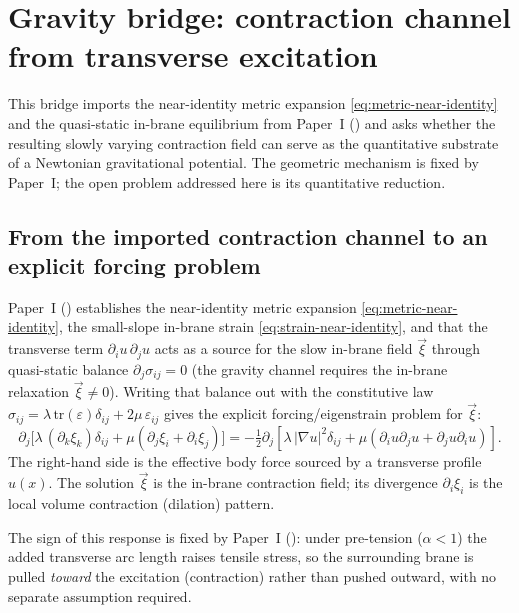 \section{Gravity bridge: contraction channel from transverse excitation}
\label{sec:gravity}

This bridge imports the near-identity metric expansion \eqref{eq:metric-near-identity} and
the quasi-static in-brane equilibrium from Paper~I () and asks
whether the resulting slowly varying contraction field can serve as the quantitative substrate
of a Newtonian gravitational potential.
The geometric mechanism is fixed by Paper~I; the open problem addressed here is its quantitative
reduction.

\subsection{From the imported contraction channel to an explicit forcing problem}

Paper~I () establishes the near-identity metric expansion
\eqref{eq:metric-near-identity}, the small-slope in-brane strain \eqref{eq:strain-near-identity},
and that the transverse term $\partial_i u\,\partial_j u$ acts as a source for the slow in-brane
field $\vec\xi$ through quasi-static balance $\partial_j\sigma_{ij}=0$ (the gravity channel
requires the in-brane relaxation $\vec\xi\neq 0$).
Writing that balance out with the constitutive law
$\sigma_{ij}=\lambda\,\mathrm{tr}(\varepsilon)\delta_{ij}+2\mu\,\varepsilon_{ij}$ gives the
explicit forcing/eigenstrain problem for $\vec\xi$:
\begin{equation}
  \partial_j\bigl[\lambda\,(\partial_k\xi_k)\delta_{ij}+\mu(\partial_j\xi_i+\partial_i\xi_j)\bigr]
  = -\tfrac12\partial_j[\lambda\,|\nabla u|^2\delta_{ij}+\mu(\partial_i u\partial_j u+\partial_j u\partial_i u)].
  \label{eq:gravity-forcing}
\end{equation}
The right-hand side is the effective body force sourced by a transverse profile $u(x)$.
The solution $\vec\xi$ is the in-brane contraction field; its divergence $\partial_i\xi_i$ is
the local volume contraction (dilation) pattern.

The sign of this response is fixed by Paper~I (): under pre-tension
($\alpha<1$) the added transverse arc length raises tensile stress, so the surrounding brane is
pulled \emph{toward} the excitation (contraction) rather than pushed outward, with no separate
assumption required.

